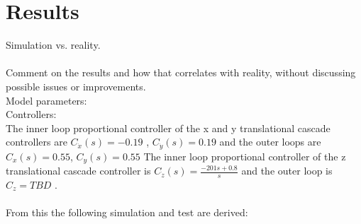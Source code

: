\section{Results}
Simulation vs. reality. \\
\\

Comment on the results and how that correlates with reality, without discussing possible issues or improvements.\\
Model parameters: \\
Controllers:\\
The inner loop proportional controller of the x and y translational cascade controllers are $C_{\dot{x}}(s)= -0.19$
, $C_{\dot{y}}(s)= 0.19$ and the outer loops are $C_x(s)= 0.55$, $C_y(s)= 0.55$
The inner loop proportional controller of the z translational cascade controller is
$C_{\dot{z}}(s)=\frac{-201s+0.8}{s}$ and the outer loop is $C_z=TBD$ .\\ \\
From this the following simulation and test are derived: 